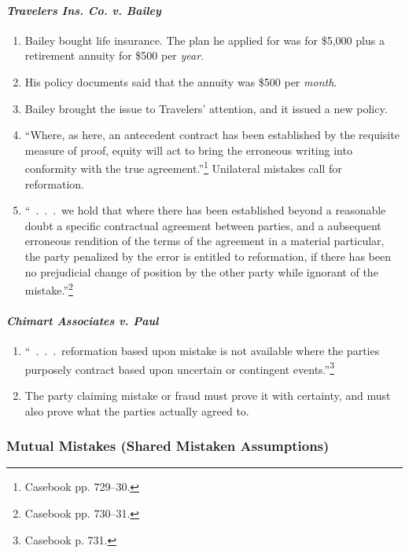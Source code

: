 \paragraph{\emph{Travelers Ins. Co. v. Bailey}}

\begin{enumerate}
    \item Bailey bought life insurance. The plan he applied for was for 
    \$5,000 plus a retirement annuity for \$500 per \emph{year}.
    \item His policy documents said that the annuity was \$500 per 
    \emph{month}.
    \item Bailey brought the issue to Travelers' attention, and it issued a 
    new policy.
    \item ``Where, as here, an antecedent contract has been established by the 
    requisite measure of proof, equity will act to bring the erroneous writing 
    into conformity with the true agreement.''\footnote{Casebook pp. 729--30.} 
    Unilateral mistakes call for reformation.
    \item ``~.~.~.~we hold that where there has been established beyond a 
    reasonable doubt a specific contractual agreement between parties, and a 
    aubsequent erroneous rendition of the terms of the agreement in a material 
    particular, the party penalized by the error is entitled to reformation, 
    if there has been no prejudicial change of position by the other party 
    while ignorant of the mistake.''\footnote{Casebook pp. 730--31.}
\end{enumerate}

\paragraph{\emph{Chimart Associates v. Paul}}

\begin{enumerate}
    \item ``~.~.~.~reformation based upon mistake is not available where the 
    parties purposely contract based upon uncertain or contingent 
    events.''\footnote{Casebook p. 731.}
    \item The party claiming mistake or fraud must prove it with certainty, 
    and must also prove what the parties actually agreed to.
\end{enumerate}

\subsubsection{Mutual Mistakes (Shared Mistaken Assumptions)}

